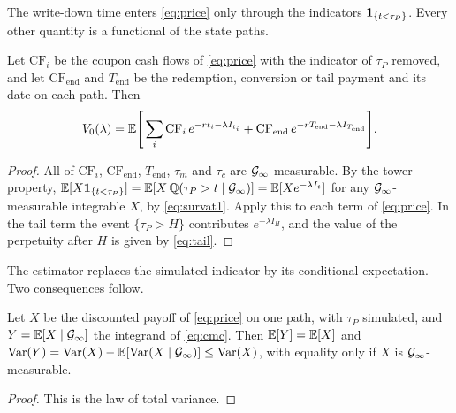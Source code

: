 The write-down time enters \eqref{eq:price} only through the indicators
$\mathbf{1}_{\{t<\tau_P\}}$. Every other quantity is a functional of the state paths.

\begin{theorem}\label{thm:cmc}
Let $\mathrm{CF}_i$ be the coupon cash flows of \eqref{eq:price} with the indicator of
$\tau_P$ removed, and let $\mathrm{CF}_{\mathrm{end}}$ and $T_{\mathrm{end}}$ be the
redemption, conversion or tail payment and its date on each path. Then
\begin{equation}\label{eq:cmc}
  V_0(\lambda)=\mathbb{E}\Biggl[\,\sum_{i}\mathrm{CF}_i\,e^{-rt_i-\lambda I_{t_i}}
  + \mathrm{CF}_{\mathrm{end}}\,e^{-rT_{\mathrm{end}}-\lambda I_{T_{\mathrm{end}}}}\Biggr].
\end{equation}
\end{theorem}

\begin{proof}
All of $\mathrm{CF}_i$, $\mathrm{CF}_{\mathrm{end}}$, $T_{\mathrm{end}}$, $\tau_m$ and
$\tau_c$ are $\mathcal{G}_\infty$-measurable. By the tower property,
$\mathbb{E}[X\mathbf{1}_{\{t<\tau_P\}}]=\mathbb{E}[X\,\mathbb{Q}(\tau_P>t\mid\mathcal{G}_\infty)]=\mathbb{E}[Xe^{-\lambda I_t}]$ for any
$\mathcal{G}_\infty$-measurable integrable $X$, by \eqref{eq:survat1}. Apply this to each term of
\eqref{eq:price}. In the tail term the event $\{\tau_P>H\}$ contributes $e^{-\lambda I_H}$,
and the value of the perpetuity after $H$ is given by \eqref{eq:tail}.
\end{proof}

The estimator replaces the simulated indicator by its conditional expectation. Two
consequences follow.

\begin{proposition}\label{prop:var}
Let $X$ be the discounted payoff of \eqref{eq:price} on one path, with $\tau_P$
simulated, and $Y=\mathbb{E}[X\mid\mathcal{G}_\infty]$ the integrand of \eqref{eq:cmc}. Then
$\mathbb{E}[Y]=\mathbb{E}[X]$ and $\operatorname{Var}(Y)=\operatorname{Var}(X)-\mathbb{E}[\operatorname{Var}(X\mid\mathcal{G}_\infty)]\le\operatorname{Var}(X)$,
with equality only if $X$ is $\mathcal{G}_\infty$-measurable.
\end{proposition}

\begin{proof}
This is the law of total variance.
\end{proof}

